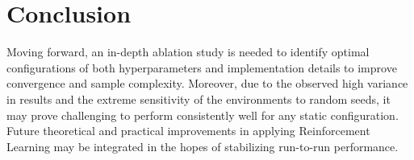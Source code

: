 \section{Conclusion}
\label{sec:conc}



Moving forward, an in-depth ablation study is needed to identify optimal configurations of both hyperparameters and implementation details to improve convergence and sample complexity. Moreover, due to the observed high variance in results and the extreme sensitivity of the environments to random seeds, it may prove challenging to perform consistently well for any static configuration. Future theoretical and practical improvements in applying Reinforcement Learning may be integrated in the hopes of stabilizing run-to-run performance. 








